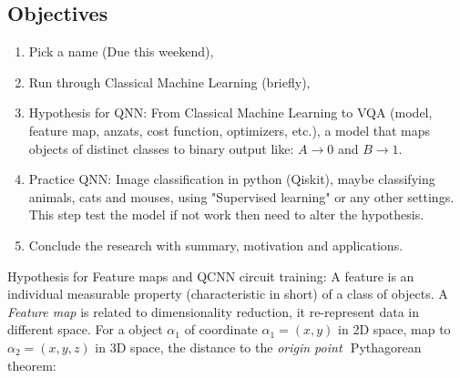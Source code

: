 \subsection{Objectives}
\begin{enumerate}
    \item Pick a name (Due this weekend),
    \item Run through Classical Machine Learning (briefly),
    \item Hypothesis for QNN: From Classical Machine Learning to VQA (model, feature map, anzats, cost function, optimizers, etc.), a model that maps objects of distinct classes to binary output like: $A \to 0$ and $B \to 1$.
    \item Practice QNN: Image classification in python (Qiskit), maybe classifying animals, cats and mouses, using "Supervised learning" or any other settings. This step test the model if not work then need to alter the hypothesis.
    \item Conclude the research with summary, motivation and applications.
\end{enumerate}

Hypothesis for Feature maps and QCNN circuit training: A feature is an individual measurable property (characteristic in short) of a class of objects. A \textit{Feature map} is related to dimensionality reduction, it re-represent data in different space.
For a object $\alpha_1$ of coordinate $\alpha_1 = (x, y)$ in 2D space, map to $\alpha_2 = (x, y, z)$ in 3D space, the distance to the \textit{origin point} $$ Pythagorean theorem:

